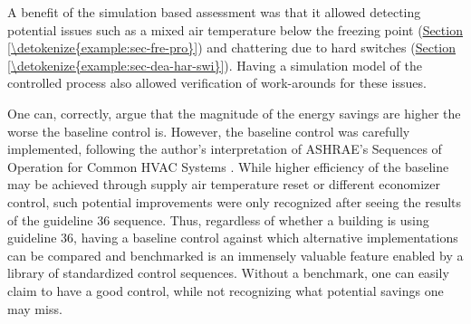 \documentclass[letterpaper,10pt, openany,english]{sphinxmanual}
\begin{document}
A benefit of the simulation based assessment was that it allowed
detecting potential issues such as a mixed air temperature below the
freezing point (\hyperref[\detokenize{example:sec-fre-pro}]{Section \ref{\detokenize{example:sec-fre-pro}}}) and chattering due to hard switches
(\hyperref[\detokenize{example:sec-dea-har-swi}]{Section \ref{\detokenize{example:sec-dea-har-swi}}}).
Having a simulation model of the controlled process also allowed
verification of work-arounds for these issues.

One can, correctly, argue that the magnitude of the energy savings
are higher the worse the baseline control is. However, the baseline control was
carefully implemented, following the author’s interpretation of
ASHRAE’s Sequences of Operation for
Common HVAC Systems . While higher efficiency
of the baseline may be achieved through supply air temperature reset
or different economizer control, such potential improvements were only
recognized after seeing the results of the guideline 36 sequence.
Thus, regardless of whether a building is using guideline 36,
having a baseline control against which alternative implementations
can be compared and benchmarked is an immensely valuable feature
enabled by a library of standardized control sequences. Without a benchmark,
one can easily claim to have a good control, while not recognizing what
potential savings one may miss.
\end{document}
